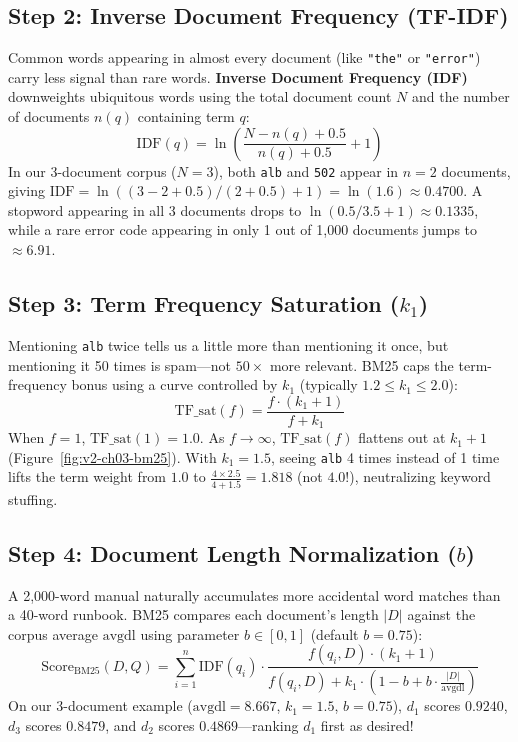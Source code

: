 \subsection*{Step 2: Inverse Document Frequency (TF-IDF)}
Common words appearing in almost every document (like \texttt{"the"} or \texttt{"error"}) carry less signal than rare words. \textbf{Inverse Document Frequency (IDF)} downweights ubiquitous words using the total document count $N$ and the number of documents $n(q)$ containing term $q$:
\begin{equation}
\text{IDF}(q) = \ln \left( \frac{N - n(q) + 0.5}{n(q) + 0.5} + 1 \right)
\end{equation}
In our 3-document corpus ($N = 3$), both \texttt{alb} and \texttt{502} appear in $n = 2$ documents, giving $\text{IDF} = \ln((3 - 2 + 0.5)/(2 + 0.5) + 1) = \ln(1.6) \approx 0.4700$. A stopword appearing in all 3 documents drops to $\ln(0.5/3.5 + 1) \approx 0.1335$, while a rare error code appearing in only 1 out of 1,000 documents jumps to $\approx 6.91$.

\subsection*{Step 3: Term Frequency Saturation ($k_1$)}
Mentioning \texttt{alb} twice tells us a little more than mentioning it once, but mentioning it 50 times is spam—not $50\times$ more relevant. BM25 caps the term-frequency bonus using a curve controlled by $k_1$ (typically $1.2 \le k_1 \le 2.0$):
\[
\text{TF\_sat}(f) = \frac{f \cdot (k_1 + 1)}{f + k_1}
\]
When $f = 1$, $\text{TF\_sat}(1) = 1.0$. As $f \to \infty$, $\text{TF\_sat}(f)$ flattens out at $k_1 + 1$ (Figure~\ref{fig:v2-ch03-bm25}). With $k_1 = 1.5$, seeing \texttt{alb} 4 times instead of 1 time lifts the term weight from $1.0$ to $\frac{4 \times 2.5}{4 + 1.5} = 1.818$ (not $4.0$!), neutralizing keyword stuffing.

\subsection*{Step 4: Document Length Normalization ($b$)}
A 2,000-word manual naturally accumulates more accidental word matches than a 40-word runbook. BM25 compares each document's length $|D|$ against the corpus average $\text{avgdl}$ using parameter $b \in [0, 1]$ (default $b = 0.75$):
\begin{equation}
\text{Score}_{\text{BM25}}(D, Q) = \sum_{i=1}^n \text{IDF}(q_i) \cdot \frac{f(q_i, D) \cdot (k_1 + 1)}{f(q_i, D) + k_1 \cdot \left(1 - b + b \cdot \frac{|D|}{\text{avgdl}}\right)}
\end{equation}
On our 3-document example ($\text{avgdl} = 8.667$, $k_1 = 1.5$, $b = 0.75$), $d_1$ scores $\mathbf{0.9240}$, $d_3$ scores $0.8479$, and $d_2$ scores $0.4869$—ranking $d_1$ first as desired!

